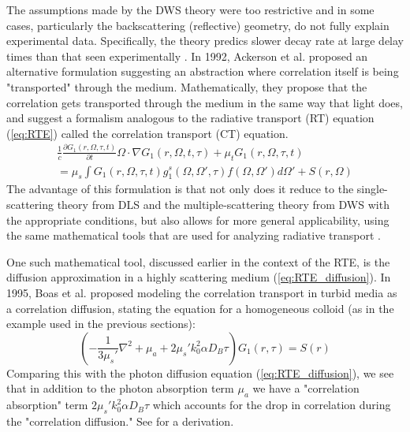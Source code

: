 The assumptions made by the DWS theory were too restrictive and in some cases, particularly the backscattering (reflective) geometry, do not fully explain experimental data. Specifically, the theory predics slower decay rate at large delay times than that seen experimentally \cite[ch. 16.2.4]{Brown1993}. In 1992, Ackerson et al.  \cite{Ackerson1992} proposed an alternative formulation suggesting an abstraction where correlation itself is being "transported" through the medium. Mathematically, they propose that the correlation gets transported through the medium in the same way that light does, and suggest a formalism analogous to the radiative transport (RT) equation (\autoref{eq:RTE}) called the correlation transport (CT) equation.
\begin{multline}\label{eq:CT}
\frac{1}{c}\frac{\partial G_1(r,\Omega,\tau,t)}{\partial t}\Omega\cdot\nabla G_1(r,\Omega,t,\tau) + \mu_t G_1(r,\Omega,\tau,t) \\
= \mu_s\int G_1(r,\Omega,\tau,t) g_1^s(\Omega,\Omega',\tau)f(\Omega, \Omega')d\Omega' + S(r,\Omega)
\end{multline}
The advantage of this formulation is that not only does it reduce to the single-scattering theory from DLS and the multiple-scattering theory from DWS with the appropriate conditions, but also allows for more general applicability, using the same mathematical tools that are used for analyzing radiative transport \cite{Ackerson1992, Dougherty1994}.

One such mathematical tool, discussed earlier in the context of the RTE, is the diffusion approximation in a highly scattering medium (\autoref{eq:RTE_diffusion}). In 1995, Boas et al. \cite{Boas1995} proposed modeling the correlation transport in turbid media as a correlation diffusion, stating the equation for a homogeneous colloid (as in the example used in the previous sections):
\begin{equation}\label{eq:CT_diffusion_Brownian}
(-\frac{1}{3\mu_s'}\nabla^2 + \mu_a + 2\mu_s'k_0^2 \alpha D_B \tau)G_1(r,\tau) = S(r)
\end{equation}
Comparing this with the photon diffusion equation (\autoref{eq:RTE_diffusion}), we see that in addition to the photon absorption term $\mu_a$ we have a "correlation absorption" term $2\mu_s'k_0^2 \alpha D_B \tau$ which accounts for the drop in correlation during the "correlation diffusion." See \cite{Boas1997} for a derivation.

